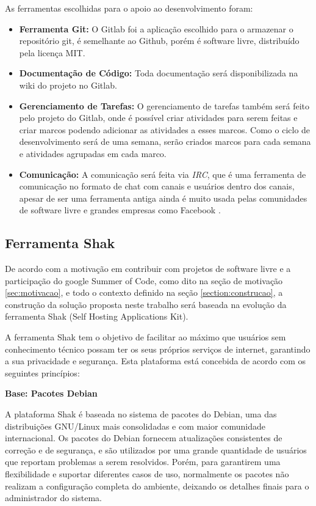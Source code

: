 As ferramentas escolhidas para o apoio ao desenvolvimento foram:
\begin{itemize}
  \item \textbf{Ferramenta Git:} O Gitlab foi a aplicação escolhido para o armazenar o
  repositório git, é semelhante ao Github, porém é software livre, distribuído pela
  licença MIT\cite{gitlab}.
  \item \textbf{Documentação de Código:} Toda documentação será disponibilizada
  na wiki do projeto no Gitlab.
  \item \textbf{Gerenciamento de Tarefas:} O gerenciamento de tarefas também será
  feito pelo projeto do Gitlab, onde é possível criar atividades para serem feitas
  e criar marcos podendo adicionar as atividades a esses marcos. Como o ciclo de
  desenvolvimento será de uma semana, serão criados marcos para cada semana e atividades
  agrupadas em cada marco.
  \item \textbf{Comunicação:} A comunicação será feita via \textit{IRC}, que é uma ferramenta
  de comunicação no formato de chat com canais e usuários dentro dos canais,
  apesar de ser uma ferramenta antiga ainda é muito usada pelas comunidades de software
  livre e grandes empresas como Facebook \cite{artigofacebook}.
\end{itemize}

\subsection{Ferramenta Shak}

De acordo com a motivação em contribuir com projetos de software livre
e a participação do google Summer of Code, como dito na seção de motivação
\ref{sec:motivacao}, e todo o contexto definido na seção \ref{section:construcao},
a construção da solução proposta neste trabalho será baseada na evolução da ferramenta Shak
(Self Hosting Applications Kit).

A ferramenta Shak tem o objetivo de facilitar ao máximo que usuários sem conhecimento
técnico possam ter os seus próprios serviços de internet, garantindo a sua privacidade
e segurança. Esta plataforma está concebida de acordo com os seguintes princípios:

\textbf{Base: Pacotes Debian}

A plataforma Shak é baseada no sistema de pacotes do Debian, uma das distribuições GNU/Linux mais consolidadas e com maior comunidade internacional. Os
pacotes do Debian fornecem atualizações consistentes de correção e de segurança,
e são utilizados por uma grande quantidade de usuários que reportam problemas a
serem resolvidos. Porém, para garantirem uma flexibilidade e suportar diferentes
casos de uso, normalmente os pacotes não realizam a configuração completa do ambiente,
deixando os detalhes finais para o administrador do sistema.

